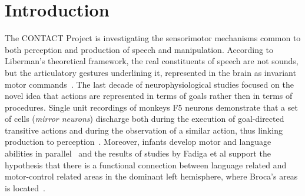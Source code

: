 \section{Introduction}
\label{ch:intro}
The CONTACT Project is investigating the
sensorimotor mechanisms common to both perception and production of speech and
manipulation.
%
According to Liberman's theoretical framework,
the real constituents of speech are not sounds, but the articulatory
gestures underlining it, represented in the brain as invariant motor 
commands~\citep{liberman.mattingly:1985}.
The last decade of neurophysiological studies focused on the novel idea that
actions are represented in terms of goals rather then in terms of
procedures. 
Single unit recordings of monkeys F5 neurons demonstrate that a set of cells
(\emph{mirror neurons}) discharge both during the execution of goal-directed 
transitive  actions and during the observation of a similar action, thus 
linking production to perception~\citep{rizzolatti.etal:1988,rizzolatti.etal:1996,rizzolatti.fadiga:1998}. 
Moreover, infants develop motor and language abilities in
parallel~\citep{lennenberg:1967,kandel.schwartz.jessel:2000} and the results of
studies by Fadiga et al support
%
%
the hypothesis that there is a functional connection between language related
and motor-control related areas in the dominant left
hemisphere, where Broca's areas is located~\citep{fadiga.etal:PRESS}. 


